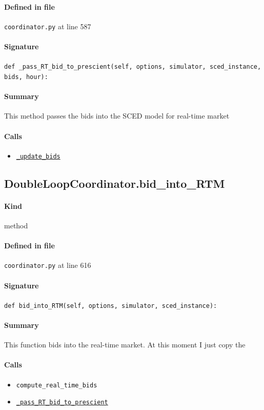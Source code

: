 \documentclass[11pt]{report}
\begin{document}
\paragraph{Defined in file} \texttt{coordinator.py} at line 587
\paragraph{Signature} \texttt{def \_pass\_RT\_bid\_to\_prescient(self, options, simulator, sced\_instance, bids, hour):}
\paragraph{Summary} This method passes the bids into the SCED model for real-time market
\paragraph{Calls}
\begin{itemize}[leftmargin=*]
  \item \hyperref[def:coordinator.py:DoubleLoopCoordinator._update_bids:L187]{\texttt{\_update\_bids}}
\end{itemize}
\subsection{DoubleLoopCoordinator.bid\_into\_RTM}
\label{def:coordinator.py:DoubleLoopCoordinator.bid_into_RTM:L616}
\paragraph{Kind} method
\paragraph{Defined in file} \texttt{coordinator.py} at line 616
\paragraph{Signature} \texttt{def bid\_into\_RTM(self, options, simulator, sced\_instance):}
\paragraph{Summary} This function bids into the real-time market. At this moment I just copy the
\paragraph{Calls}
\begin{itemize}[leftmargin=*]
  \item \texttt{compute\_real\_time\_bids}
  \item \hyperref[def:coordinator.py:DoubleLoopCoordinator._pass_RT_bid_to_prescient:L587]{\texttt{\_pass\_RT\_bid\_to\_prescient}}
\end{itemize}
\end{document}
